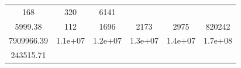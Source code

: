 \documentclass[]{book}
\theoremstyle{definition}
\theoremstyle{definition}
\theoremstyle{definition}
\theoremstyle{remark}
\begin{document}
\begin{longtable}[]{@{}cccccc@{}}
\begin{minipage}[t]{0.13\columnwidth}
168\strut
\end{minipage} & \begin{minipage}[t]{0.13\columnwidth}\centering\strut
320\strut
\end{minipage} & \begin{minipage}[t]{0.13\columnwidth}\centering\strut
6141\strut
\end{minipage}\tabularnewline
\begin{minipage}[t]{0.15\columnwidth}\centering\strut
5999.38\strut
\end{minipage} & \begin{minipage}[t]{0.13\columnwidth}\centering\strut
112\strut
\end{minipage} & \begin{minipage}[t]{0.13\columnwidth}\centering\strut
1696\strut
\end{minipage} & \begin{minipage}[t]{0.13\columnwidth}\centering\strut
2173\strut
\end{minipage} & \begin{minipage}[t]{0.13\columnwidth}\centering\strut
2975\strut
\end{minipage} & \begin{minipage}[t]{0.13\columnwidth}\centering\strut
820242\strut
\end{minipage}\tabularnewline
\begin{minipage}[t]{0.15\columnwidth}\centering\strut
7909966.39\strut
\end{minipage} & \begin{minipage}[t]{0.13\columnwidth}\centering\strut
1.1e+07\strut
\end{minipage} & \begin{minipage}[t]{0.13\columnwidth}\centering\strut
1.2e+07\strut
\end{minipage} & \begin{minipage}[t]{0.13\columnwidth}\centering\strut
1.3e+07\strut
\end{minipage} & \begin{minipage}[t]{0.13\columnwidth}\centering\strut
1.4e+07\strut
\end{minipage} & \begin{minipage}[t]{0.13\columnwidth}\centering\strut
1.7e+08\strut
\end{minipage}\tabularnewline
\begin{minipage}[t]{0.15\columnwidth}\centering\strut
243515.71\strut
\end{minipage} & \begin{minipage}[t]{0.13\columnwidth}\centering\strut

\end{minipage}
\end{longtable}
\end{document}
